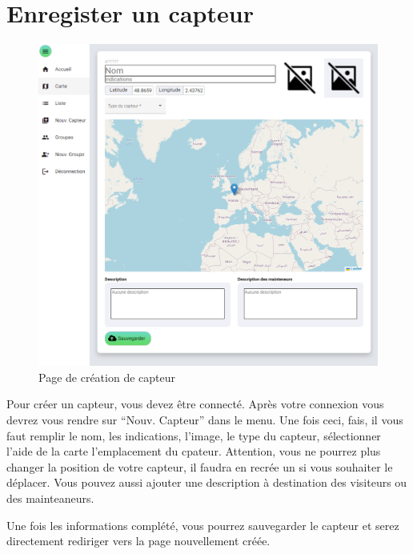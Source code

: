 \section{Enregister un capteur}\label{sec:enregistrer-un-capteur}

    \begin{figure}[H]
        \begin{center}
            \includegraphics[width=12cm]{resources/create_sensor}
        \end{center}
        \caption{Page de création de capteur}\label{fig:create-sensor}
    \end{figure}

    Pour créer un capteur, vous devez être connecté.
    Après votre connexion vous devrez vous rendre sur ``Nouv. Capteur'' dans le menu.
    Une fois ceci, fais, il vous faut remplir le nom, les indications, l'image, le type du capteur,
    sélectionner l'aide de la carte l'emplacement du cpateur.
    Attention, vous ne pourrez plus changer la position de votre capteur,
    il faudra en recrée un si vous souhaiter le déplacer.
    Vous pouvez aussi ajouter une description à destination des visiteurs ou des mainteaneurs.

    Une fois les informations complété, vous pourrez sauvegarder le capteur et serez directement rediriger vers la page nouvellement créée.

    \clearpage
